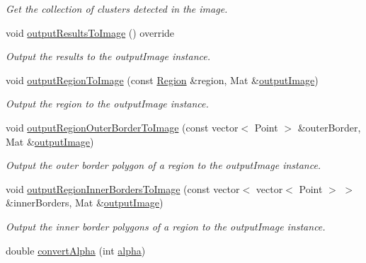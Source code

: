 \begin{DoxyCompactItemize}
\begin{DoxyCompactList}\small\item\em Get the collection of clusters detected in the image. \end{DoxyCompactList}\item 
void \hyperlink{classmultiscale_1_1analysis_1_1RegionDetector_a23a3ada51983d2a3041f403323e27d06}{output\-Results\-To\-Image} () override
\begin{DoxyCompactList}\small\item\em Output the results to the output\-Image instance. \end{DoxyCompactList}\item 
void \hyperlink{classmultiscale_1_1analysis_1_1RegionDetector_a24ba08d74eb72c25d0bdc994ac06d1e0}{output\-Region\-To\-Image} (const \hyperlink{classmultiscale_1_1analysis_1_1Region}{Region} \&region, Mat \&\hyperlink{classmultiscale_1_1analysis_1_1Detector_a144e080a3af03c9bf3d8a80315823c86}{output\-Image})
\begin{DoxyCompactList}\small\item\em Output the region to the output\-Image instance. \end{DoxyCompactList}\item 
void \hyperlink{classmultiscale_1_1analysis_1_1RegionDetector_af1c1c2df496a95af24aef36dd7c8db61}{output\-Region\-Outer\-Border\-To\-Image} (const vector$<$ Point $>$ \&outer\-Border, Mat \&\hyperlink{classmultiscale_1_1analysis_1_1Detector_a144e080a3af03c9bf3d8a80315823c86}{output\-Image})
\begin{DoxyCompactList}\small\item\em Output the outer border polygon of a region to the output\-Image instance. \end{DoxyCompactList}\item 
void \hyperlink{classmultiscale_1_1analysis_1_1RegionDetector_a376b05ae82667521347a4aed760a43d4}{output\-Region\-Inner\-Borders\-To\-Image} (const vector$<$ vector$<$ Point $>$ $>$ \&inner\-Borders, Mat \&\hyperlink{classmultiscale_1_1analysis_1_1Detector_a144e080a3af03c9bf3d8a80315823c86}{output\-Image})
\begin{DoxyCompactList}\small\item\em Output the inner border polygons of a region to the output\-Image instance. \end{DoxyCompactList}\item 
double \hyperlink{classmultiscale_1_1analysis_1_1RegionDetector_a3de7a4d365c182917b74117a22075ec4}{convert\-Alpha} (int \hyperlink{classmultiscale_1_1analysis_1_1RegionDetector_ab768a3bbfff9835b441a889ab2cb05a6}{alpha})

\end{DoxyCompactItemize}
